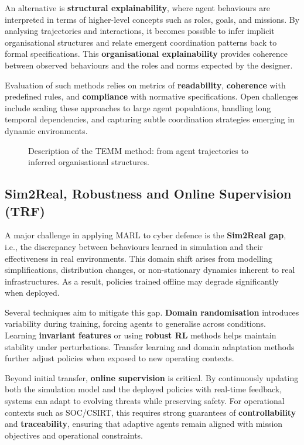 \documentclass[a4paper,10pt,twocolumn]{article}
\begin{document}
An alternative is \textbf{structural explainability}, where agent
behaviours are interpreted in terms of higher-level concepts such as
roles, goals, and missions. By analysing trajectories and interactions,
it becomes possible to infer implicit organisational structures and
relate emergent coordination patterns back to formal specifications.
This \textbf{organisational explainability} provides coherence between
observed behaviours and the roles and norms expected by the designer.

Evaluation of such methods relies on metrics of \textbf{readability},
\textbf{coherence} with predefined rules, and \textbf{compliance} with
normative specifications. Open challenges include scaling these
approaches to large agent populations, handling long temporal
dependencies, and capturing subtle coordination strategies emerging
in dynamic environments.

\begin{figure}[h!]
    \centering
    \resizebox{0.95\textwidth}{!}{%
        
    }
    \caption{Description of the TEMM method: from agent trajectories to inferred organisational structures.}
    \label{fig:mm_synthesis}
\end{figure}


\subsection{Sim2Real, Robustness and Online Supervision (TRF)}

A major challenge in applying MARL to cyber defence is the
\textbf{Sim2Real gap}, i.e., the discrepancy between behaviours learned
in simulation and their effectiveness in real environments. This domain
shift arises from modelling simplifications, distribution changes, or
non-stationary dynamics inherent to real infrastructures. As a result,
policies trained offline may degrade significantly when deployed.

Several techniques aim to mitigate this gap. \textbf{Domain
    randomisation} introduces variability during training, forcing agents
to generalise across conditions. Learning \textbf{invariant features}
or using \textbf{robust RL} methods helps maintain stability under
perturbations. Transfer learning and domain adaptation methods
\cite{Taylor2009} further adjust policies when exposed to new operating
contexts.

Beyond initial transfer, \textbf{online supervision} is critical. By
continuously updating both the simulation model and the deployed
policies with real-time feedback, systems can adapt to evolving threats
while preserving safety. For operational contexts such as SOC/CSIRT,
this requires strong guarantees of \textbf{controllability} and
\textbf{traceability}, ensuring that adaptive agents remain aligned with
mission objectives and operational constraints.
\end{document}
